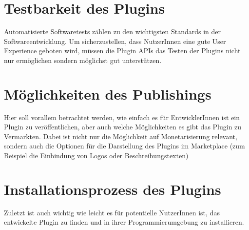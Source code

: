 \section{Testbarkeit des Plugins}
\label{sec:Kriterien_Testbarkeit}

Automatisierte Softwaretests zählen zu den wichtigsten
Standards in der Softwareentwicklung.
Um sicherzustellen, dass NutzerInnen eine gute User Experience
geboten wird, müssen die Plugin APIs das Testen der
Plugins nicht nur ermöglichen sondern möglichst
gut unterstützen.


\section{Möglichkeiten des Publishings}
\label{sec:Kriterien_Publishing}

Hier soll vorallem betrachtet werden, wie
einfach es für EntwicklerInnen ist ein Plugin zu 
veröffentlichen, aber auch welche Möglichkeiten es gibt 
das Plugin zu Vermarkten. Dabei ist nicht nur die Möglichkeit
auf Monetarisierung relevant, sondern auch die
Optionen für die Darstellung des Plugins im Marketplace 
(zum Beispiel die Einbindung von Logos oder Beschreibungstexten)


\section{Installationsprozess des Plugins}
\label{sec:Kriterien_Installationsprozess}

Zuletzt ist auch wichtig wie leicht es für potentielle 
NutzerInnen ist, das entwickelte Plugin zu finden und
in ihrer Programmierumgebung zu installieren.